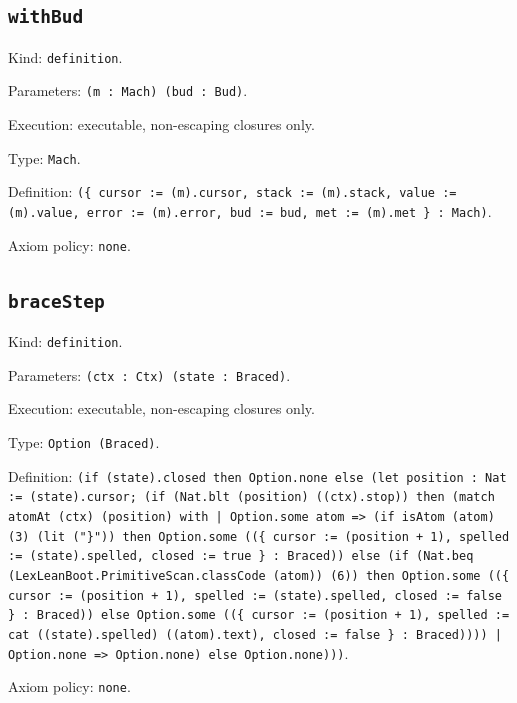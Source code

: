 \documentclass[11pt]{article}
\begin{document}
\subsection*{\texttt{withBud}}
\noindent Kind: \texttt{definition}.\par
\noindent Parameters: \texttt{(m : Mach) (bud : Bud)}.\par
\noindent Execution: executable, non-escaping closures only.\par
\noindent Type: \texttt{Mach}.\par
\noindent Definition: \texttt{(\{ cursor := (m).cursor, stack := (m).stack, value := (m).value, error := (m).error, bud := bud, met := (m).met \} : Mach)}.\par
\noindent Axiom policy: \texttt{none}.\par
\subsection*{\texttt{braceStep}}
\noindent Kind: \texttt{definition}.\par
\noindent Parameters: \texttt{(ctx : Ctx) (state : Braced)}.\par
\noindent Execution: executable, non-escaping closures only.\par
\noindent Type: \texttt{Option (Braced)}.\par
\noindent Definition: \texttt{(if (state).closed then Option.none else (let position : Nat := (state).cursor; (if (Nat.blt (position) ((ctx).stop)) then (match atomAt (ctx) (position) with | Option.some atom => (if isAtom (atom) (3) (lit ("\}")) then Option.some ((\{ cursor := (position + 1), spelled := (state).spelled, closed := true \} : Braced)) else (if (Nat.beq (LexLeanBoot.PrimitiveScan.classCode (atom)) (6)) then Option.some ((\{ cursor := (position + 1), spelled := (state).spelled, closed := false \} : Braced)) else Option.some ((\{ cursor := (position + 1), spelled := cat ((state).spelled) ((atom).text), closed := false \} : Braced)))) | Option.none => Option.none) else Option.none)))}.\par
\noindent Axiom policy: \texttt{none}.\par
\end{document}
